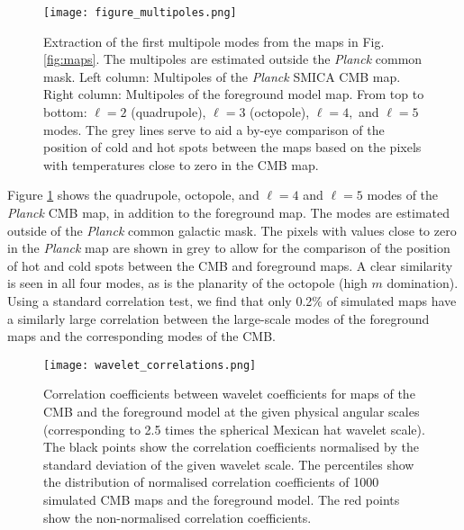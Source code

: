 \documentclass{aa}
\begin{document}
\begin{figure}[htbp]
\centering
   \texttt{[image: figure\_multipoles.png]}
     \caption{Extraction of the first multipole modes from the maps in Fig. \ref{fig:maps}. The multipoles are estimated outside the \textit{Planck} common mask. Left column: Multipoles of the \textit{Planck} SMICA CMB map.  Right column: Multipoles of the foreground model map. From top to bottom:  $\ell=2$ (quadrupole), $\ell=3$ (octopole), $\ell=4,$ and $\ell=5$ modes. The grey lines serve to aid a by-eye comparison of the position of cold and hot spots between the maps based on the pixels with temperatures close to zero in the CMB map.}
     \label{fig:multipoles}
\end{figure}


Figure \ref{fig:multipoles} shows the quadrupole, octopole, and $\ell=4$ and $\ell=5$ modes of the \textit{Planck} CMB map, in addition to the foreground map. The modes are estimated outside of the \textit{Planck} common galactic mask. The pixels with values close to zero in the \textit{Planck} map are shown in grey to allow for the comparison of the position of hot and cold spots between the CMB and foreground maps. A clear similarity is seen in all four modes, as is the planarity of the octopole (high $m$ domination). Using a standard correlation test, we find that only 0.2\% of simulated maps have a similarly large correlation between the large-scale modes of the foreground maps and the corresponding modes of the CMB.

\begin{figure}[htbp]
\centering
   \texttt{[image: wavelet\_correlations.png]}
     \caption{Correlation coefficients between wavelet coefficients for maps of the CMB and the foreground model at the given physical angular scales (corresponding to 2.5 times the spherical Mexican hat wavelet scale). The black points show the correlation coefficients normalised by the standard deviation of the given wavelet scale. The percentiles show the distribution of normalised correlation coefficients of 1000 simulated CMB maps and the foreground model. The red points show the non-normalised correlation coefficients.}
     \label{fig:wavcor}
\end{figure}
\end{document}
